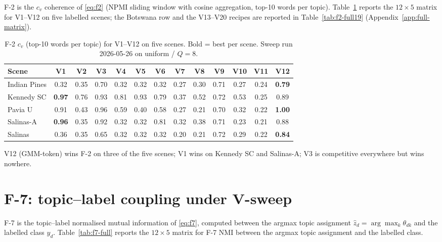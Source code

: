 \documentclass[journal,a4paper,10pt]{IEEEtran}
\begin{document}
F-2 is the $c_v$ coherence of \eqref{eq:f2} (NPMI sliding window with
cosine aggregation, top-10 words per topic).
Table~\ref{tab:f2-full} reports the $12 \times 5$ matrix for V1--V12
on five labelled scenes; the Botswana row and the V13--V20 recipes are
reported in Table~\ref{tab:f2-full19} (Appendix~\ref{app:full-matrix}).

\begin{table}[ht]
\caption{F-2 $c_v$ (top-10 words per topic) for V1--V12 on five
scenes. Bold = best per scene. Sweep run 2026-05-26 on uniform / $Q = 8$.}
\label{tab:f2-full}
\centering
\small
\begin{tabular}{lcccccccccccc}
\toprule
Scene & V1 & V2 & V3 & V4 & V5 & V6 & V7 & V8 & V9 & V10 & V11 & V12 \\
\midrule
Indian Pines     & 0.32 & 0.35 & 0.70 & 0.32 & 0.32 & 0.32 & 0.27 & 0.30 & 0.71 & 0.27 & 0.24 & \textbf{0.79} \\
Kennedy SC       & \textbf{0.97} & 0.76 & 0.93 & 0.81 & 0.93 & 0.79 & 0.37 & 0.52 & 0.72 & 0.53 & 0.25 & 0.89 \\
Pavia U          & 0.91 & 0.43 & 0.96 & 0.59 & 0.40 & 0.58 & 0.27 & 0.21 & 0.70 & 0.32 & 0.22 & \textbf{1.00} \\
Salinas-A        & \textbf{0.96} & 0.35 & 0.92 & 0.32 & 0.32 & 0.81 & 0.32 & 0.38 & 0.71 & 0.23 & 0.21 & 0.88 \\
Salinas          & 0.36 & 0.35 & 0.65 & 0.32 & 0.32 & 0.32 & 0.20 & 0.21 & 0.72 & 0.29 & 0.22 & \textbf{0.84} \\
\bottomrule
\end{tabular}
\end{table}

V12 (GMM-token) wins F-2 on three of the five scenes; V1 wins on Kennedy
SC and Salinas-A; V3 is competitive everywhere but wins nowhere.

\section{F-7: topic--label coupling under V-sweep}
\label{sec:f7-results}

F-7 is the topic--label normalised mutual information of
\eqref{eq:f7}, computed between the argmax topic assignment
$\hat{z}_d = \arg\max_k \theta_{dk}$ and the labelled class $y_d$.
Table~\ref{tab:f7-full} reports the $12 \times 5$ matrix for F-7
NMI between the argmax topic assignment and the labelled class.
\end{document}
